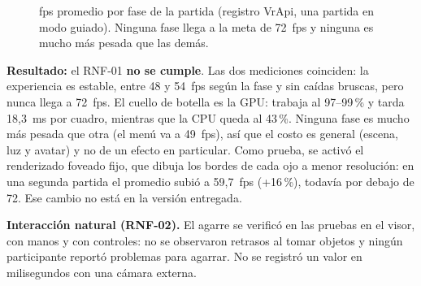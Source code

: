 \documentclass[11pt,a4paper]{article}
\begin{document}
\begin{figure}[htbp]
\centering
{}
\caption{fps promedio por fase de la partida (registro VrApi, una partida en modo guiado). Ninguna fase llega a la meta de 72~fps y ninguna es mucho más pesada que las demás.}
\label{fig:fpsfase}
\end{figure}

\textbf{Resultado:} el RNF-01 \textbf{no se cumple}. Las dos mediciones coinciden: la experiencia es estable, entre 48 y 54~fps según la fase y sin caídas bruscas, pero nunca llega a 72~fps. El cuello de botella es la GPU: trabaja al 97--99\,\% y tarda 18,3~ms por cuadro, mientras que la CPU queda al 43\,\%. Ninguna fase es mucho más pesada que otra (el menú va a 49~fps), así que el costo es general (escena, luz y avatar) y no de un efecto en particular. Como prueba, se activó el renderizado foveado fijo, que dibuja los bordes de cada ojo a menor resolución: en una segunda partida el promedio subió a 59,7~fps (+16\,\%), todavía por debajo de 72. Ese cambio no está en la versión entregada.

\textbf{Interacción natural (RNF-02).} El agarre se verificó en las pruebas en el visor, con manos y con controles: no se observaron retrasos al tomar objetos y ningún participante reportó problemas para agarrar. No se registró un valor en milisegundos con una cámara externa.
\end{document}
